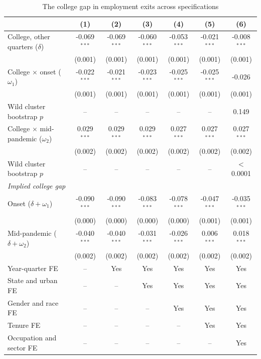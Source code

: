 \begin{table}[H]
\centering
\caption{The college gap in employment exits across specifications}
\label{tab:spec_ladder}
\begin{threeparttable}
\small
\setlength{\tabcolsep}{4pt}
\begin{tabular}{lcccccc}
\toprule
& (1) & (2) & (3) & (4) & (5) & (6) \\
\midrule
College, other quarters ($\delta$) & -0.069$^{***}$ & -0.069$^{***}$ & -0.060$^{***}$ & -0.053$^{***}$ & -0.021$^{***}$ & -0.008$^{***}$ \\
 & (0.001) & (0.001) & (0.001) & (0.001) & (0.001) & (0.001) \\
\addlinespace
College $\times$ onset ($\omega_1$) & -0.022$^{***}$ & -0.021$^{***}$ & -0.023$^{***}$ & -0.025$^{***}$ & -0.025$^{***}$ & -0.026 \\
 & (0.001) & (0.001) & (0.001) & (0.001) & (0.001) & (0.001) \\
\quad Wild cluster bootstrap $p$ & -- & -- & -- & -- & -- & 0.149 \\
\addlinespace
College $\times$ mid-pandemic ($\omega_2$) & 0.029$^{***}$ & 0.029$^{***}$ & 0.029$^{***}$ & 0.027$^{***}$ & 0.027$^{***}$ & 0.027$^{***}$ \\
 & (0.002) & (0.002) & (0.002) & (0.002) & (0.002) & (0.002) \\
\quad Wild cluster bootstrap $p$ & -- & -- & -- & -- & -- & $<$0.0001 \\
\midrule
\multicolumn{7}{l}{\textit{Implied college gap}} \\
\quad Onset ($\delta+\omega_1$) & -0.090$^{***}$ & -0.090$^{***}$ & -0.083$^{***}$ & -0.078$^{***}$ & -0.047$^{***}$ & -0.035$^{***}$ \\
 & (0.000) & (0.000) & (0.000) & (0.000) & (0.001) & (0.001) \\
\addlinespace
\quad Mid-pandemic ($\delta+\omega_2$) & -0.040$^{***}$ & -0.040$^{***}$ & -0.031$^{***}$ & -0.026$^{***}$ & 0.006$^{***}$ & 0.018$^{***}$ \\
 & (0.002) & (0.002) & (0.002) & (0.002) & (0.002) & (0.002) \\
\midrule
Year-quarter FE & -- & Yes & Yes & Yes & Yes & Yes \\
State and urban FE & -- & -- & Yes & Yes & Yes & Yes \\
Gender and race FE & -- & -- & -- & Yes & Yes & Yes \\
Tenure FE & -- & -- & -- & -- & Yes & Yes \\
Occupation and sector FE & -- & -- & -- & -- & -- & Yes \\

\end{tabular}
\end{threeparttable}
\end{table}
